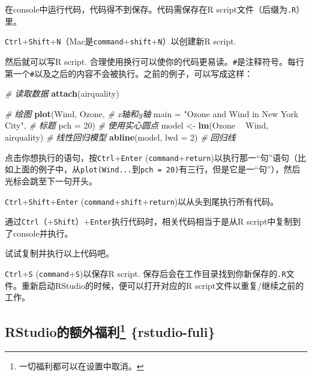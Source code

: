 \documentclass[]{book}
\newenvironment{Shaded}{\begin{snugshade}}{\end{snugshade}}
\newcommand{\CommentTok}[1]{\textcolor[rgb]{0.56,0.35,0.01}{\textit{#1}}}
\newcommand{\DataTypeTok}[1]{\textcolor[rgb]{0.13,0.29,0.53}{#1}}
\newcommand{\DecValTok}[1]{\textcolor[rgb]{0.00,0.00,0.81}{#1}}
\newcommand{\KeywordTok}[1]{\textcolor[rgb]{0.13,0.29,0.53}{\textbf{#1}}}
\newcommand{\NormalTok}[1]{#1}
\newcommand{\OperatorTok}[1]{\textcolor[rgb]{0.81,0.36,0.00}{\textbf{#1}}}
\newcommand{\StringTok}[1]{\textcolor[rgb]{0.31,0.60,0.02}{#1}}
\let\rmarkdownfootnote\footnote%
\def\footnote{\protect\rmarkdownfootnote}
\begin{document}
在console中运行代码，代码得不到保存。代码需保存在R script文件（后缀为\texttt{.R}）里。

\texttt{Ctrl}+\texttt{Shift}+\texttt{N}（Mac是\texttt{command}+\texttt{shift}+\texttt{N}）以创建新R script.

然后就可以写R script. 合理使用换行可以使你的代码更易读。\texttt{\#}是注释符号。每行第一个\texttt{\#}以及之后的内容不会被执行。之前的例子，可以写成这样：

\begin{Shaded}
\begin{Highlighting}[]
\CommentTok{# 读取数据}
\KeywordTok{attach}\NormalTok{(airquality)}

\CommentTok{# 绘图}
\KeywordTok{plot}\NormalTok{(Wind, Ozone, }\CommentTok{# x轴和y轴}
     \DataTypeTok{main =} \StringTok{"Ozone and Wind in New York City"}\NormalTok{, }\CommentTok{# 标题}
     \DataTypeTok{pch =} \DecValTok{20}\NormalTok{) }\CommentTok{# 使用实心圆点}
\NormalTok{model <-}\StringTok{ }\KeywordTok{lm}\NormalTok{(Ozone }\OperatorTok{~}\StringTok{ }\NormalTok{Wind, airquality) }\CommentTok{# 线性回归模型}
\KeywordTok{abline}\NormalTok{(model, }\DataTypeTok{lwd =} \DecValTok{2}\NormalTok{) }\CommentTok{# 回归线}
\end{Highlighting}
\end{Shaded}

点击你想执行的语句，按\texttt{Ctrl}+\texttt{Enter} (\texttt{command}+\texttt{return})以执行那一``句''语句（比如上面的例子中，从\texttt{plot(Wind...}到\texttt{pch\ =\ 20)}有三行，但是它是一``句''），然后光标会跳至下一句开头。

\texttt{Ctrl}+\texttt{Shift}+\texttt{Enter} (\texttt{command}+\texttt{shift}+\texttt{return})以从头到尾执行所有代码。

通过\texttt{Ctrl}（+\texttt{Shift}）+\texttt{Enter}执行代码时，相关代码相当于是从R script中复制到了console并执行。

试试复制并执行以上代码吧。

\texttt{Ctrl}+\texttt{S} (\texttt{command}+\texttt{S})以保存R script. 保存后会在工作目录找到你新保存的\texttt{.R}文件。重新启动RStudio的时候，便可以打开对应的R script文件以重复/继续之前的工作。

\hypertarget{rstudiofuli-rstudio-fuli}{%
\subsection[RStudio的额外福利 \{rstudio-fuli\}]{\texorpdfstring{RStudio的额外福利\footnote{一切福利都可以在设置中取消。} \{rstudio-fuli\}}{RStudio的额外福利 \{rstudio-fuli\}}}\label{rstudiofuli-rstudio-fuli}}
\end{document}
